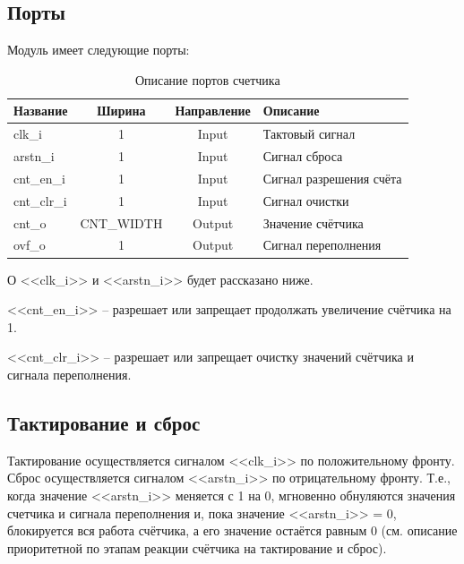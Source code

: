 \documentclass[12pt, a4paper]{article}
\begin{document}
	\subsection{Порты}
	
	Модуль имеет следующие порты:
	
	\begin{table}[H]
		\centering
		\begin{tabular}{|p{2.5cm}|c|c|p{5cm}|}
			\hline
			\textbf{Название} & \textbf{Ширина} & \textbf{Направление} & \textbf{Описание} \\
			\hline
			clk\_i & 1 & Input & Тактовый сигнал \\
			\hline
			arstn\_i & 1 & Input & Сигнал сброса \\
			\hline
			cnt\_en\_i & 1 & Input & Сигнал разрешения счёта \\
			\hline
			cnt\_clr\_i & 1 & Input & Сигнал очистки \\
			\hline
			cnt\_o & CNT\_WIDTH & Output & Значение счётчика \\
			\hline
			ovf\_o & 1 & Output & Сигнал переполнения \\
			\hline
		\end{tabular}
		
		\caption{Описание портов счетчика}
		\label{tab:counter_ports}
	\end{table}
	
	О <<clk\_i>> и <<arstn\_i>> будет рассказано ниже.
	
	<<cnt\_en\_i>> -- разрешает или запрещает продолжать увеличение счётчика на 1.
	
	<<cnt\_clr\_i>> -- разрешает или запрещает очистку значений счётчика и сигнала переполнения.
	
	\subsection{Тактирование и сброс}
	
	Тактирование осуществляется сигналом <<clk\_i>> по положительному фронту. \\
	
	Сброс осуществляется сигналом <<arstn\_i>> по отрицательному фронту. Т.е., когда значение <<arstn\_i>> меняется с 1 на 0, мгновенно обнуляются значения счетчика и сигнала переполнения и, пока значение <<arstn\_i>> = 0, блокируется вся работа счётчика, а его значение остаётся равным 0 (см. описание приоритетной по этапам реакции счётчика на тактирование и сброс).
	
\end{document}
